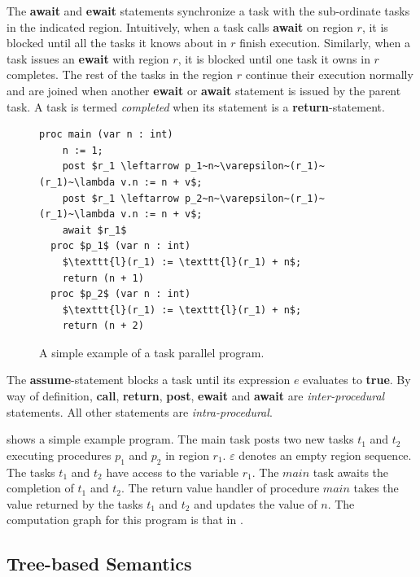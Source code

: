 The \textbf{await} and \textbf{ewait} statements synchronize a task with the sub-ordinate tasks in the indicated region. Intuitively, when a task calls \textbf{await} on region $r$, it is blocked until all the tasks it knows about in $r$ finish execution. Similarly, when a task issues an \textbf{ewait} with region $r$, it is blocked until one task it owns in $r$ completes. The rest of the tasks in the region  $r$ continue their execution normally and are joined when another \textbf{ewait} or \textbf{await} statement is issued by the parent task. A task is termed \emph{completed} when its statement is a \textbf{return}-statement. 

\begin{figure}[h]
  \begin{center}
    \begin{lstlisting}[mathescape=true]
  proc main (var n : int)
  	n := 1;
	post $r_1 \leftarrow p_1~n~\varepsilon~(r_1)~(r_1)~\lambda v.n := n + v$;
	post $r_1 \leftarrow p_2~n~\varepsilon~(r_1)~(r_1)~\lambda v.n := n + v$;
	await $r_1$
  proc $p_1$ (var n : int)
  	$\texttt{l}(r_1) := \texttt{l}(r_1) + n$;
	return (n + 1)
  proc $p_2$ (var n : int)
  	$\texttt{l}(r_1) := \texttt{l}(r_1) + n$;
	return (n + 2)
\end{lstlisting}
  \end{center}
  \vspace{-1em}
  \caption{A simple example of a task parallel program.}
  \label{fig:hj-async-finish}
\end{figure}

The \textbf{assume}-statement blocks a task until its expression $e$ evaluates to \textbf{true}. By way of definition, \textbf{call}, \textbf{return}, \textbf{post}, \textbf{ewait} and \textbf{await} are \emph{inter-procedural} statements. All other statements are \emph{intra-procedural}.

 shows a simple example program. The main task posts two new tasks $t_1$ and $t_2$ executing procedures $p_1$ and $p_2$ in region $r_1$. $\varepsilon$ denotes an empty region sequence. The tasks $t_1$ and $t_2$ have access to the variable $r_1$. The $main$ task awaits the completion of $t_1$ and $t_2$. The return value handler of procedure $main$ takes the value returned by the tasks $t_1$ and $t_2$ and updates the value of $n$. The computation graph for this program is that in .

\subsection{Tree-based Semantics}

